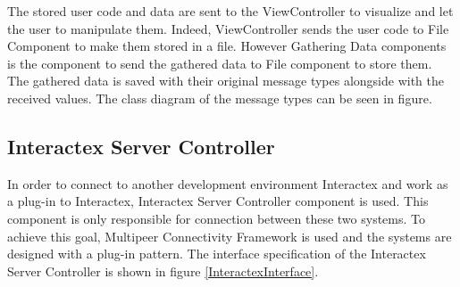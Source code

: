 The stored user code and data are sent to the ViewController to visualize and let the user to manipulate them. Indeed, ViewController sends the user code to File Component to make them stored in a file. However Gathering Data components is the component to send the gathered data to File component to store them. The gathered data is saved with their original message types alongside with the received values. The class diagram of the message types can be seen in figure.


\subsection{Interactex Server Controller}
In order to connect to another development environment Interactex and work as a plug-in to Interactex, Interactex Server Controller component is used. This component is only responsible for connection between these two systems. To achieve this goal, Multipeer Connectivity Framework is used and the systems are designed with a plug-in pattern. The interface specification of the Interactex Server Controller is shown in figure \ref{InteractexInterface}.\\

